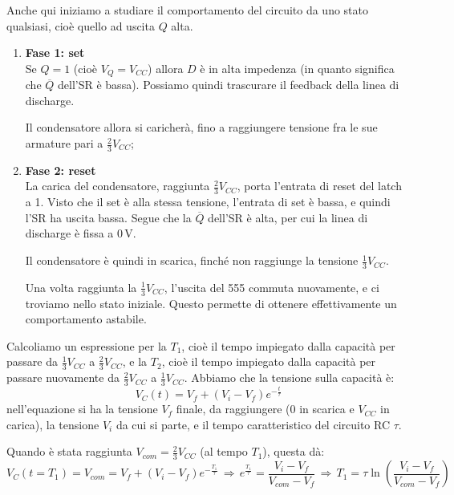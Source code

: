 \documentclass[a4paper,11pt]{article}
\begin{document}
Anche qui iniziamo a studiare il comportamento del circuito da uno stato qualsiasi, cioè quello ad uscita $Q$ alta.
\begin{enumerate}
\item \textbf{\textsf{Fase 1: set}} \\
	Se $Q = 1$ (cioè $V_{Q} = V_{CC}$) allora $D$ è in alta impedenza (in quanto significa che $\overline{Q}$ dell'SR è bassa). Possiamo quindi trascurare il feedback della linea di discharge. 

Il condensatore allora si caricherà, fino a raggiungere tensione fra le sue armature pari a $\frac{2}{3} V_{CC}$;

\item \textbf{\textsf{Fase 2: reset}} \\
La carica del condensatore, raggiunta $\frac{2}{3} V_{CC}$, porta l'entrata di reset del latch a 1. Visto che il set è alla stessa tensione, l'entrata di set è bassa, e quindi l'SR ha uscita bassa. Segue che la $\overline{Q}$ dell'SR è alta, per cui la linea di discharge è fissa a $0 \, \mathrm{V}$.

Il condensatore è quindi in scarica, finché non raggiunge la tensione $\frac{1}{3} V_{CC}$.

Una volta raggiunta la $\frac{1}{3} V_{CC}$, l'uscita del 555 commuta nuovamente, e ci troviamo nello stato iniziale. Questo permette di ottenere effettivamente un comportamento astabile.
\end{enumerate}

Calcoliamo un espressione per la $T_1$, cioè il tempo impiegato dalla capacità per passare da $\frac{1}{3} V_{CC}$ a $\frac{2}{3} V_{CC}$, e la $T_2$, cioè il tempo impiegato dalla capacità per passare nuovamente da $\frac{2}{3} V_{CC}$ a $\frac{1}{3} V_{CC}$. Abbiamo che la tensione sulla capacità è:
$$
V_C(t) = V_f + (V_i - V_f) e^{-\frac{t}{\tau}}
$$
nell'equazione si ha la tensione $V_{f}$ finale, da raggiungere ($0$ in scarica e $V_{CC}$ in carica), la tensione $V_i$ da cui si parte, e il tempo caratteristico del circuito RC $\tau$.

Quando è stata raggiunta $V_{com} = \frac{2}{3} V_{CC}$ (al tempo $T_1$), questa dà:
$$
V_C(t = T_1) = V_{com} = V_f + (V_i - V_f) e^{-\frac{T_1}{\tau}}
\, \Rightarrow \,
e^{\frac{T_1}{\tau}} = \frac{V_i - V_f}{V_{com} - V_f}
\, \Rightarrow \,
T_1 = \tau \ln \left( \frac{V_i - V_f}{V_{com} - V_f} \right)
$$
\end{document}
